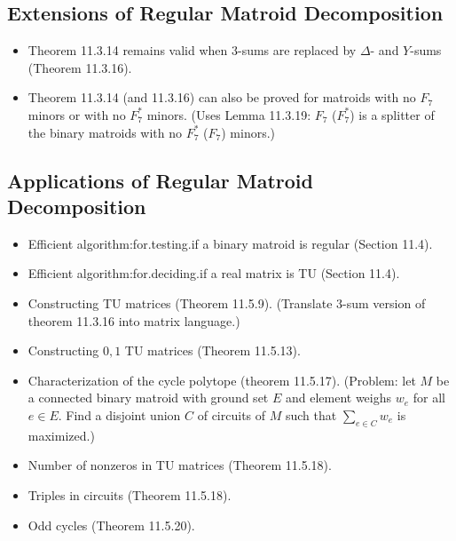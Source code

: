 \subsection{Extensions of Regular Matroid Decomposition}

\begin{itemize}
  \item Theorem 11.3.14 remains valid when $3$-sums are replaced by $\Delta$- and $Y$-sums (Theorem 11.3.16).
  \item Theorem 11.3.14 (and 11.3.16) can also be proved for matroids with no $F_{7}$ minors or with no $F_{7}^{*}$ minors. (Uses Lemma 11.3.19: $F_{7}$ ($F_{7}^{*}$) is a splitter of the binary matroids with no $F_{7}^{*}$ ($F_{7}$) minors.)
\end{itemize}


\subsection{Applications of Regular Matroid Decomposition}

\begin{itemize}
  \item Efficient algorithm:for.testing.if a binary matroid is regular (Section 11.4).
  \item Efficient algorithm:for.deciding.if a real matrix is TU (Section 11.4).
  \item Constructing TU matrices (Theorem 11.5.9). (Translate $3$-sum version of theorem 11.3.16 into matrix language.)
  \item Constructing ${0, 1}$ TU matrices (Theorem 11.5.13).
  \item Characterization of the cycle polytope (theorem 11.5.17). (Problem: let $M$ be a connected binary matroid with ground set $E$ and element weighs $w_{e}$ for all $e \in E$. Find a disjoint union $C$ of circuits of $M$ such that $\sum_{e \in C} w_{e}$ is maximized.)
  \item Number of nonzeros in TU matrices (Theorem 11.5.18).
  \item Triples in circuits (Theorem 11.5.18).
  \item Odd cycles (Theorem 11.5.20).
\end{itemize}
